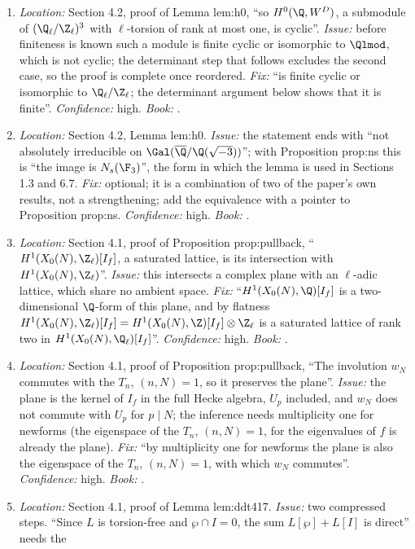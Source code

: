 \begin{sloppypar}
\begin{enumerate}[resume*=errata]
\item\label{err:paper:h0-cyclic} \emph{Location:} Section 4.2, proof of Lemma lem:h0, ``so $H^0(\Q,W^D)$, a submodule of $(\Q_\ell/\Z_\ell)^3$ with $\ell$-torsion of rank at most one, is cyclic''. \emph{Issue:}
before finiteness is known such a module is finite cyclic or isomorphic to $\Qlmod$, which is not cyclic; the determinant step that follows excludes the second case, so the proof is
complete once reordered. \emph{Fix:} ``is finite cyclic or isomorphic to $\Q_\ell/\Z_\ell$; the determinant argument below shows that it is finite''. \emph{Confidence:} high. \emph{Book:}
.
\item\label{err:paper:h0-iff} \emph{Location:} Section 4.2, Lemma lem:h0. \emph{Issue:} the statement ends with ``not absolutely irreducible on $\Gal(\overline\Q/\Q(\sqrt{-3}))$''; with Proposition prop:ns this
is ``the image is $N_s(\F_3)$'', the form in which the lemma is used in Sections 1.3 and 6.7. \emph{Fix:} optional; it is a combination of two of the paper's own results, not a strengthening; add the equivalence with a pointer to Proposition prop:ns. \emph{Confidence:} high.
\emph{Book:} .
\item\label{err:paper:plane} \emph{Location:} Section 4.1, proof of Proposition prop:pullback, ``$H^1(X_0(N),\Z_\ell)[I_f]$, a saturated lattice, is its intersection with $H^1(X_0(N),\Z_\ell)$''. \emph{Issue:}
this intersects a complex plane with an $\ell$-adic lattice, which share no ambient space. \emph{Fix:} ``$H^1(X_0(N),\Q)[I_f]$ is a two-dimensional $\Q$-form of this plane, and by flatness
$H^1(X_0(N),\Z_\ell)[I_f]=H^1(X_0(N),\Z)[I_f]\otimes\Z_\ell$ is a saturated lattice of rank two in $H^1(X_0(N),\Q_\ell)[I_f]$''. \emph{Confidence:} high. \emph{Book:} .
\item\label{err:paper:wn} \emph{Location:} Section 4.1, proof of Proposition prop:pullback, ``The involution $w_N$ commutes with the $T_n$, $(n,N)=1$, so it preserves the plane''. \emph{Issue:} the plane is the
kernel of $I_f$ in the full Hecke algebra, $U_p$ included, and $w_N$ does not commute with $U_p$ for $p\mid N$; the inference needs multiplicity one for newforms (the eigenspace of the $T_n$,
$(n,N)=1$, for the eigenvalues of $f$ is already the plane). \emph{Fix:} ``by multiplicity one for newforms the plane is also the eigenspace of the $T_n$, $(n,N)=1$, with which $w_N$ commutes''.
\emph{Confidence:} high. \emph{Book:} .
\item\label{err:paper:ddt417-steps} \emph{Location:} Section 4.1, proof of Lemma lem:ddt417. \emph{Issue:} two compressed steps. ``Since $L$ is torsion-free and $\wp\cap I=0$, the sum $L[\wp]+L[I]$ is direct'' needs the

\end{enumerate}
\end{sloppypar}

